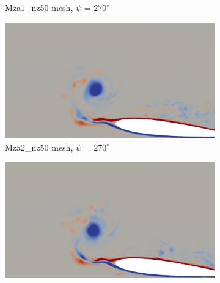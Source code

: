 \begin{figure}[H]
\begin{subfigure}[b]{0.475\textwidth}
		\caption{Mza1\_nz50 mesh, $\psi$ = $270^\circ$}
		\label{fig:Mza1_50_sp_psi270}
	\end{subfigure}
	\begin{subfigure}[b]{0.475\textwidth}
		\centering
		\includegraphics[width=1\textwidth]{figures/zonal_adapt_results/vorticity_plots/v3/Mza2_50/spavg/phase_270.png}
		\caption{Mza2\_nz50 mesh, $\psi$ = $270^\circ$}
		\label{fig:Mza2_50_sp_psi270}
	\end{subfigure}	
	\begin{subfigure}[b]{0.475\textwidth}
		\centering
		\includegraphics[width=1\textwidth]{figures/zonal_adapt_results/vorticity_plots/v3/Mza2_100/spavg/phase_270.png}

\end{subfigure}
\end{figure}
